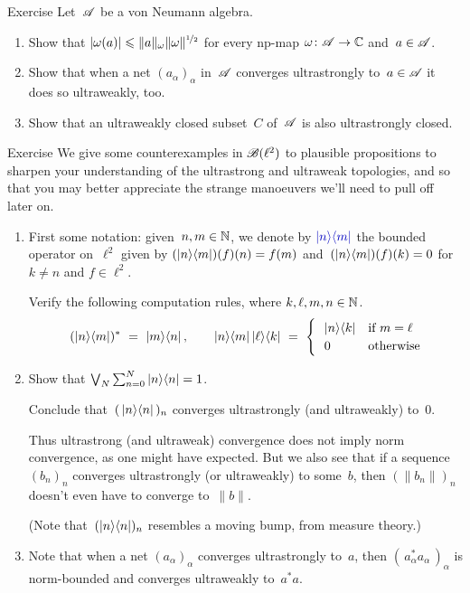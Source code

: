 \documentclass[a]{subfiles}
\begin{document}
\begin{parsec}%
\begin{point}[uwweaker]{Exercise}%
Let~$\scrA$ be a von Neumann algebra.
\begin{enumerate}
\item
Show that 
$\left|\omega(a)\right|\leq \|a\|_\omega \|\omega\|^{\nicefrac{1}{2}}$
for every np-map $\omega\colon \scrA\to\C$
and~$a\in\scrA$.
\item
Show that when a net $(a_\alpha)_\alpha$
in~$\scrA$ converges ultrastrongly to~$a\in \scrA$
it does so ultraweakly, too.
\item
Show that an ultraweakly closed subset~$C$ of~$\scrA$
is also ultrastrongly closed.
\end{enumerate}
\end{point}
\begin{point}[vn-counterexamples]{Exercise}%
We give some counterexamples in $\scrB(\ell^2)$
to plausible propositions
to sharpen your understanding of the ultrastrong and ultraweak topologies,
and so that you may better appreciate
the strange manoeuvers we'll need to pull off later on.
\begin{enumerate}
\item
First some notation: given~$n,m\in \N$,
we denote by $\Define{\ketbra{n}{m}}$
the bounded operator on~$\ell^2$
given by $(\ketbra{n}{m})(f)(n)=f(m)$
and~$(\ketbra{n}{m})(f)(k)=0$ for $k\neq n$
and $f\in \ell^2$.

Verify the following computation rules,
where $k,\ell,m,n\in \N$.
\begin{equation*}
(\ketbra{n}{m})^*\ =\ \ketbra{m}{n},
\qquad
\ketbra{n}{m}\ketbra{\ell}{k}\ =\ 
\begin{cases}
\ \ \ketbra{n}{k} & \text{if $m=\ell$} \\
\ \ 0 & \text{otherwise}
\end{cases}
\end{equation*}
\item
Show that $\bigvee_N \sum_{n=0}^N \ketbra{n}{n}=1$.

Conclude that~$(\,\ketbra{n}{n}\,)_n$
converges ultrastrongly (and ultraweakly) to~$0$.

Thus ultrastrong (and ultraweak) convergence does not imply norm convergence,
as one might have expected.
But we also see that if a sequence~$(b_n)_n$ converges ultrastrongly
(or ultraweakly) to some~$b$,
then $(\|b_n\|)_n$ doesn't even have to converge to~$\|b\|$.

(Note that~$(\ketbra{n}{n})_n$ resembles a moving bump, from measure theory.)
\item
Note that when a net $(a_\alpha)_\alpha$
converges ultrastrongly to~$a$,
then $(\,a_\alpha^*a_\alpha\,)_\alpha$
is norm-bounded and
converges ultraweakly to~$a^*a$.


\end{enumerate}
\end{point}
\end{parsec}
\end{document}
